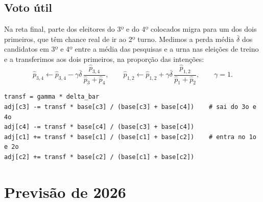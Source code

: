 \documentclass[10.5pt,a4paper]{article}
\begin{document}
\subsection{Voto útil}
Na reta final, parte dos eleitores do 3º e do 4º colocados migra para um dos dois primeiros, que têm chance real de ir ao 2º turno. Medimos a perda média $\bar\delta$ dos candidatos em 3º e 4º entre a média das pesquisas e a urna nas eleições de treino e a transferimos aos dois primeiros, na proporção das intenções:
\begin{equation}
\hat p_{3,4}\leftarrow \hat p_{3,4}-\gamma\bar\delta\,\frac{\hat p_{3,4}}{\hat p_3+\hat p_4},\qquad
\hat p_{1,2}\leftarrow \hat p_{1,2}+\gamma\bar\delta\,\frac{\hat p_{1,2}}{\hat p_1+\hat p_2},\qquad \gamma=1 .
\end{equation}
\begin{lstlisting}
transf = gamma * delta_bar
adj[c3] -= transf * base[c3] / (base[c3] + base[c4])    # sai do 3o e 4o
adj[c4] -= transf * base[c4] / (base[c3] + base[c4])
adj[c1] += transf * base[c1] / (base[c1] + base[c2])    # entra no 1o e 2o
adj[c2] += transf * base[c2] / (base[c1] + base[c2])
\end{lstlisting}

\section{Previsão de 2026}
\end{document}
